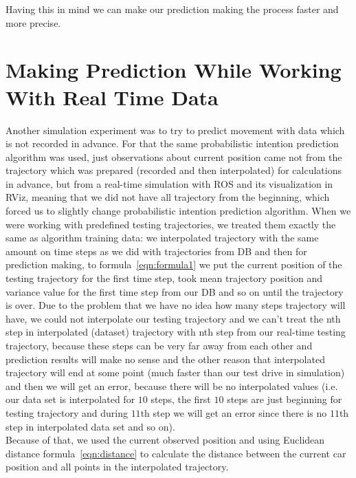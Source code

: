 Having this in mind we can make our prediction making the process faster and more precise. 

\section{Making Prediction While Working With Real Time Data}

Another simulation experiment was to try to predict movement with data which is not recorded in advance. For that the same probabilistic intention prediction algorithm was used, just observations about current position came not from the trajectory which was prepared (recorded and then interpolated) for calculations in advance, but from a real-time simulation with \gls{ROS} and its visualization in \gls{RViz}, meaning that we did not have all trajectory from the beginning, which forced us to slightly change probabilistic intention prediction algorithm. When we were working with predefined testing trajectories, we treated them exactly the same as algorithm training data: we interpolated trajectory with the same amount on time steps as we did with trajectories from \gls{DB} and then for prediction making, to formula~\ref{eqn:formula1} we put the current position of the testing trajectory for the first time step, took mean trajectory position and variance value for the first time step from our \gls{DB} and so on until the trajectory is over. Due to the problem that we have no idea how many steps trajectory will have, we could not interpolate our testing trajectory and we can't treat the nth step in interpolated (dataset) trajectory with nth step from our real-time testing trajectory, because these steps can be very far away from each other and prediction results will make no sense and the other reason that interpolated trajectory will end at some point (much faster than our test drive in simulation) and then we will get an error, because there will be no interpolated values (i.e. our data set is interpolated for $10$ steps, the first $10$ steps are just beginning for testing trajectory and during $11$th step we will get an error since there is no $11$th step in interpolated data set and so on). \\
Because of that, we used the current observed position and using Euclidean distance formula~\ref{eqn:distance} to calculate the distance between the current car position and all points in the interpolated trajectory. 

